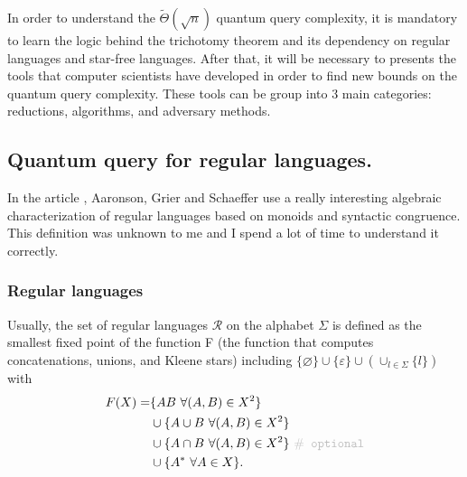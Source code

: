 In order to understand the $\tilde{\Theta}(\sqrt{n})$ quantum
query complexity, it is mandatory to learn the logic behind the
trichotomy theorem \cite{trichotomy_not_andris} and its dependency on regular
languages and star-free languages.
After that, it will be necessary to presents the tools
that computer scientists have developed in order to
find new bounds on the quantum query complexity.
These tools can be group into 3 main categories:
reductions, algorithms, and adversary methods\cite{adversary_equivalence}.

\subsection{Quantum query for regular languages.}

In the article \cite{trichotomy_not_andris}, Aaronson, Grier and Schaeffer use
a really interesting algebraic characterization of regular languages based on
monoids and syntactic congruence. This definition was unknown to me and I spend
a lot of time to understand it correctly.

\subsubsection{Regular languages}

Usually, the set of regular languages $\mathcal{R}$ on the alphabet $\Sigma$ is
defined as the smallest fixed point of the function F (the function that computes
concatenations, unions, and Kleene stars) including $\{\varnothing\} \cup
    \{\varepsilon\} \cup(\cup_{l\in\Sigma}\{l\})$ with
\begin{align*}\label{eq:F}
    F(X) = & \{AB\  \forall (A,B)\in X^2\}                                                   \\
           & \cup \{A\cup B\ \forall (A,B) \in X^2 \}                                        \\
           & \cup \{A\cap B\ \forall (A,B) \in X^2 \}\ \texttt{\color{gray!50}$\#$ optional} \\
           & \cup \{A^*\ \forall A \in X \}.
\end{align*}

